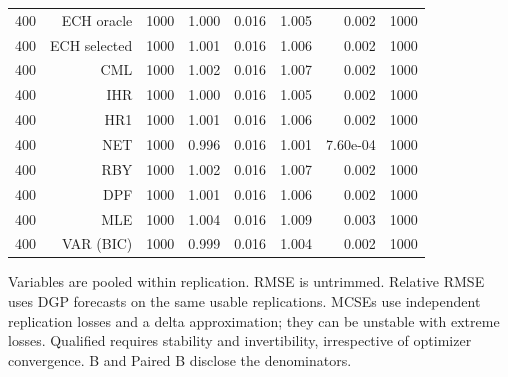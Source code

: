 \begin{table}[p]
\begin{tabular}{rrrrrrrr}
400 & ECH oracle & 1000 & 1.000 & 0.016 & 1.005 & 0.002 & 1000 \\
400 & ECH selected & 1000 & 1.001 & 0.016 & 1.006 & 0.002 & 1000 \\
400 & CML & 1000 & 1.002 & 0.016 & 1.007 & 0.002 & 1000 \\
400 & IHR & 1000 & 1.000 & 0.016 & 1.005 & 0.002 & 1000 \\
400 & HR1 & 1000 & 1.001 & 0.016 & 1.006 & 0.002 & 1000 \\
400 & NET & 1000 & 0.996 & 0.016 & 1.001 & 7.60e-04 & 1000 \\
400 & RBY & 1000 & 1.002 & 0.016 & 1.007 & 0.002 & 1000 \\
400 & DPF & 1000 & 1.001 & 0.016 & 1.006 & 0.002 & 1000 \\
400 & MLE & 1000 & 1.004 & 0.016 & 1.009 & 0.003 & 1000 \\
400 & VAR (BIC) & 1000 & 0.999 & 0.016 & 1.004 & 0.002 & 1000 \\
\bottomrule\end{tabular}
\par\medskip
\begin{minipage}{0.98\linewidth}\footnotesize Variables are pooled within replication. RMSE is untrimmed. Relative RMSE uses DGP forecasts on the same usable replications. MCSEs use independent replication losses and a delta approximation; they can be unstable with extreme losses. Qualified requires stability and invertibility, irrespective of optimizer convergence. B and Paired B disclose the denominators.\end{minipage}
\end{table}
